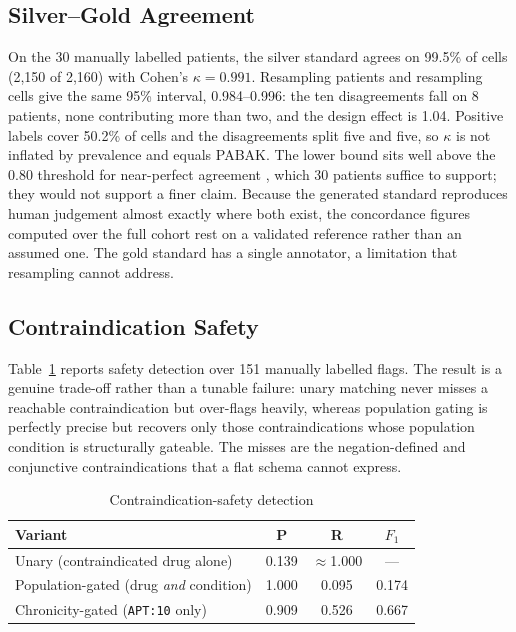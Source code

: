 \documentclass[conference]{IEEEtran}
\begin{document}
\subsection{Silver--Gold Agreement}
On the 30 manually labelled patients, the silver standard agrees on 99.5\% of cells (2,150
of 2,160) with Cohen's $\kappa = 0.991$. Resampling patients and resampling cells give the
same 95\% interval, 0.984--0.996: the ten disagreements fall on 8 patients, none
contributing more than two, and the design effect is 1.04. Positive labels cover 50.2\% of
cells and the disagreements split five and five, so $\kappa$ is not inflated by prevalence
and equals PABAK. The lower bound sits well above the 0.80 threshold for near-perfect
agreement \cite{landis1977}, which 30 patients suffice to support; they would not support a
finer claim. Because the generated standard reproduces human judgement almost exactly where
both exist, the concordance figures computed over the full cohort rest on a validated
reference rather than an assumed one. The gold standard has a single annotator, a limitation
that resampling cannot address.

\subsection{Contraindication Safety}
Table~\ref{tab:safety} reports safety detection over 151 manually labelled flags. The
result is a genuine trade-off rather than a tunable failure: unary matching never misses a
reachable contraindication but over-flags heavily, whereas population gating is perfectly
precise but recovers only those contraindications whose population condition is
structurally gateable. The misses are the negation-defined and conjunctive
contraindications that a flat schema cannot express.

\begin{table}[htbp]
\caption{Contraindication-safety detection}
\label{tab:safety}
\begin{center}
\begin{tabular}{|l|c|c|c|}
\hline
\textbf{Variant} & \textbf{P} & \textbf{R} & \textbf{$F_1$} \\
\hline
Unary (contraindicated drug alone) & 0.139 & $\approx$1.000 & --- \\
Population-gated (drug \emph{and} condition) & 1.000 & 0.095 & 0.174 \\
Chronicity-gated (\texttt{APT:10} only) & 0.909 & 0.526 & 0.667 \\
\hline
\end{tabular}
\end{center}
\end{table}
\end{document}
